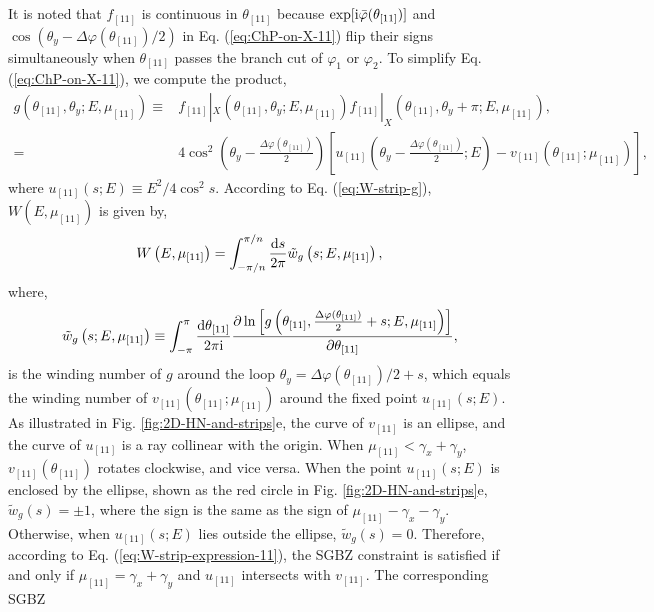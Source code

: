 \documentclass[pdflatex,sn-nature, iicol]{sn-jnl}%
\theoremstyle{thmstyleone}%
\theoremstyle{thmstyletwo}%
\theoremstyle{thmstylethree}%
\begin{document}
It is noted that $f_{[11]}$ is continuous in $\theta_{[11]}$ because
$\exp[\mathrm{i}\bar{\varphi}(\theta_{[11]})]$ and $\cos(\theta_{y}-\Delta\varphi(\theta_{[11]})/2)$
in Eq. (\ref{eq:ChP-on-X-11}) flip their signs simultaneously when
$\theta_{[11]}$ passes the branch cut of $\varphi_{1}$ or $\varphi_{2}$.
To simplify Eq. (\ref{eq:ChP-on-X-11}), we compute the product, 
\begin{align}
g\left(\theta_{[11]},\theta_{y};E,\mu_{[11]}\right)\equiv & f_{[11]}|_{X}\left(\theta_{[11]},\theta_{y};E,\mu_{[11]}\right)f_{[11]}|_{X}\left(\theta_{[11]},\theta_{y}+\pi;E,\mu_{[11]}\right),\nonumber \\
= & 4\cos^{2}\left(\theta_{y}-\frac{\Delta\varphi(\theta_{[11]})}{2}\right)\left[u_{[11]}\left(\theta_{y}-\frac{\Delta\varphi(\theta_{[11]})}{2};E\right)-v_{[11]}\left(\theta_{[11]};\mu_{[11]}\right)\right],
\end{align}
where $u_{[11]}\left(s;E\right)\equiv E^{2}/4\cos^{2}s$. According
to Eq. (\ref{eq:W-strip-g}), $W(E,\mu_{[11]})$ is given by, 
\begin{equation}
W\left(E,\mu_{[11]}\right)=\int_{-\pi/n}^{\pi/n}\frac{\mathrm{d} s}{2\pi}\tilde{w}_{g}\left(s;E,\mu_{[11]}\right),\label{eq:W-strip-expression-11}
\end{equation}
where, 
\begin{equation}
\tilde{w}_{g}\left(s;E,\mu_{[11]}\right)\equiv\int_{-\pi}^{\pi}\frac{\mathrm{d}\theta_{[11]}}{2\pi\mathrm{i}}\frac{\partial\ln\left[g\left(\theta_{[11]},\frac{\Delta\varphi(\theta_{[11]})}{2}+s;E,\mu_{[11]}\right)\right]}{\partial\theta_{[11]}},
\end{equation}
is the winding number of $g$ around the loop $\theta_{y}=\Delta\varphi(\theta_{[11]})/2+s$,
which equals the winding number of $v_{[11]}(\theta_{[11]};\mu_{[11]})$
around the fixed point $u_{[11]}(s;E)$. As illustrated in Fig. \ref{fig:2D-HN-and-strips}e,
the curve of $v_{[11]}$ is an ellipse, and the curve of $u_{[11]}$
is a ray collinear with the origin. When $\mu_{[11]}<\gamma_{x}+\gamma_{y}$,
$v_{[11]}(\theta_{[11]})$ rotates clockwise, and vice versa. When
the point $u_{[11]}(s;E)$ is enclosed by the ellipse, shown as the
red circle in Fig. \ref{fig:2D-HN-and-strips}e, $\tilde{w}_{g}(s)=\pm1$,
where the sign is the same as the sign of $\mu_{[11]}-\gamma_{x}-\gamma_{y}$.
Otherwise, when $u_{[11]}(s;E)$ lies outside the ellipse, $\tilde{w}_{g}(s)=0$.
Therefore, according to Eq. (\ref{eq:W-strip-expression-11}), the
SGBZ constraint is satisfied if and only if $\mu_{[11]}=\gamma_{x}+\gamma_{y}$
and $u_{[11]}$ intersects with $v_{[11]}$. The corresponding SGBZ
\end{document}
